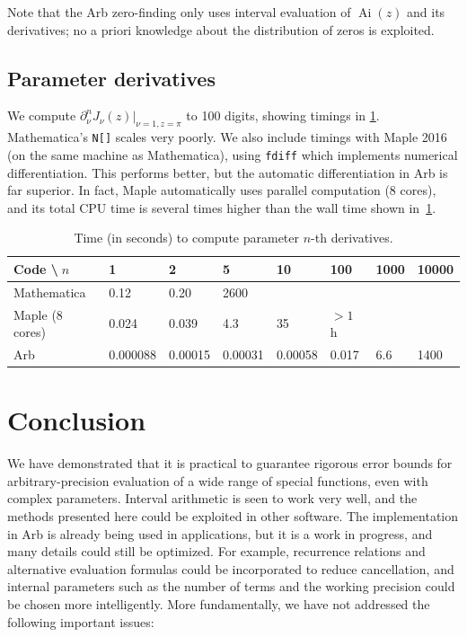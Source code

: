 \documentclass[11pt,a4paper]{article}
\begin{document}
Note that the Arb zero-finding only uses interval evaluation
of $\operatorname{Ai}(z)$ and its derivatives; 
no a priori knowledge about the distribution of zeros
is exploited.

\subsection{Parameter derivatives}

We compute $\partial_{\nu}^n J_{\nu}(z) \vert_{\nu=1,z=\pi}$ to 100 digits,
showing timings in \cref{tab:paramderiv}.
Mathematica's \texttt{N[]} scales very poorly.
We also include timings with Maple 2016 (on the same machine as Mathematica),
using \texttt{fdiff} which implements numerical differentiation.
This performs better, but the automatic
differentiation in Arb is far superior.
In fact, Maple automatically uses parallel computation (8 cores), and its total CPU
time is several times higher than the wall time shown in~\cref{tab:paramderiv}.

\begin{table}[h!]
\renewcommand{\arraystretch}{1.1}
\setlength{\tabcolsep}{.4em}
\begin{center}
\begin{small}
\begin{tabular}{l | l l l l l l l}
Code \textbackslash $\;n$      & 1 & 2 & 5 & 10 & 100 & 1000 & 10000  \\ \hline
Mathematica     & 0.12     & 0.20    & 2600    &         &       &     &        \\
Maple (8 cores) & 0.024    & 0.039   & 4.3     & 35       & $>1$ h   &     &        \\
Arb             & 0.000088 & 0.00015 & 0.00031 & 0.00058 & 0.017 & 6.6 & 1400
\end{tabular}
\end{small}
\caption{Time (in seconds) to compute parameter $n$-th derivatives.}
\label{tab:paramderiv}
\end{center}
\end{table}

\section{Conclusion}

We have demonstrated that it is practical
to guarantee rigorous error bounds for arbitrary-precision evaluation
of a wide range of special functions, even with complex parameters.
Interval arithmetic is seen to work very well, and the methods
presented here could be exploited in other software.
The implementation in Arb is already being used in applications,
but it is a work in progress, and many details could still be optimized.
For example, recurrence relations and alternative evaluation formulas
could be incorporated to reduce cancellation,
and internal parameters such as the number of terms
and the working precision could be chosen more intelligently.
More fundamentally, we have not addressed the following important issues:
\end{document}

